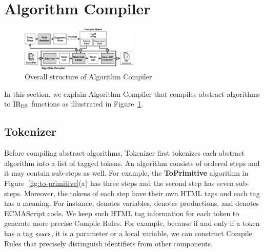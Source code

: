 \section{Algorithm Compiler}\label{sec:compiler}
\begin{figure}
  \centering
  \includegraphics[width=0.5\textwidth]{img/algo_compiler.png}
  \caption{Overall structure of {\sf Algorithm Compiler}}
  \label{fig:algo-compiler}
\end{figure}

In this section, we explain {\sf Algorithm Compiler} that compiles
abstract algorithms to \( \text{IR}_\text{ES} \) functions as illustrated in
Figure~\ref{fig:algo-compiler}.

\subsection{Tokenizer}
Before compiling abstract algorithms, {\sf Tokenizer} first tokenizes
each abstract algorithm into a list of tagged tokens.  An algorithm
consists of ordered steps and it may contain sub-steps as well.
For example, the \textbf{\small ToPrimitive} algorithm in
Figure~\ref{fig:to-primitive}(a) has three steps and the second step
has seven sub-steps.  Moreover, the tokens of each step have their own
HTML tags and each tag has a meaning.  For instance, 
denotes variables,  denotes productions, and
 denotes ECMAScript code.
We keep such HTML tag information for each token to generate more precise
{\sf Compile Rules}.  For example, because if and only if a token has
a tag \( \texttt{\footnotesize<var>} \), it is a parameter or a local variable, we can
construct {\sf Compile Rules} that precisely distinguish identifiers
from other components.

